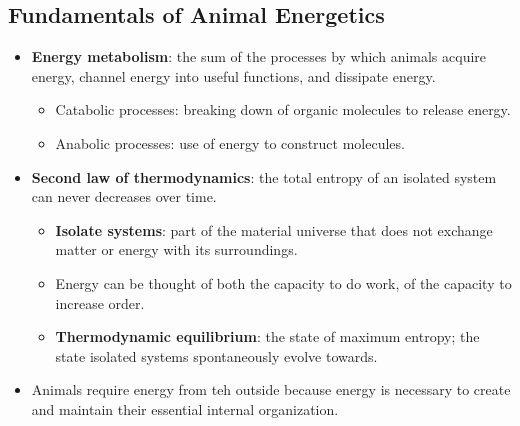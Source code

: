 \documentclass[12pt,a4paper]{article}
\begin{document}
\subsection{Fundamentals of Animal Energetics}
\begin{itemize}
    \item \textbf{Energy metabolism}: the sum of the processes by which animals acquire energy, channel energy into useful functions, and dissipate energy. 
        \begin{itemize}
            \item Catabolic processes: breaking down of organic molecules to release energy.
            \item Anabolic processes: use of energy to construct molecules.
        \end{itemize}
    \item \textbf{Second law of thermodynamics}: the total entropy of an isolated system can never decreases over time. 
        \begin{itemize}
            \item \textbf{Isolate systems}: part of the material universe that does not exchange matter or energy with its surroundings.
            \item Energy can be thought of both the capacity to do work, of the capacity to {\color{o-Sun}increase order}.
            \item \textbf{Thermodynamic equilibrium}: the state of maximum entropy; the state isolated systems spontaneously evolve towards.
        \end{itemize}
    \item Animals require energy from teh outside because energy is necessary to create and maintain their essential internal organization.

\end{itemize}
\end{document}
